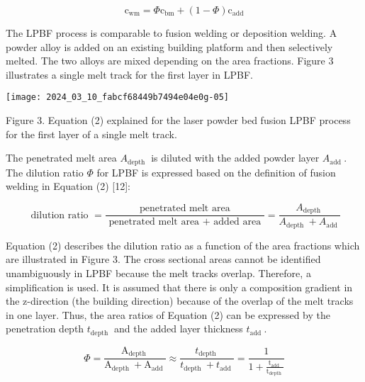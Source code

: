 \documentclass[10pt]{article}
\begin{document}
\begin{equation*}
\mathrm{c}_{\mathrm{wm}}=\Phi \mathrm{c}_{\mathrm{bm}}+(1-\Phi) \mathrm{c}_{\mathrm{add}} \tag{1}
\end{equation*}


The LPBF process is comparable to fusion welding or deposition welding. A powder alloy is added on an existing building platform and then selectively melted. The two alloys are mixed depending on the area fractions. Figure 3 illustrates a single melt track for the first layer in LPBF.

\begin{center}
\texttt{[image: 2024\_03\_10\_fabcf68449b7494e04e0g-05]}
\end{center}

Figure 3. Equation (2) explained for the laser powder bed fusion LPBF process for the first layer of a single melt track.

The penetrated melt area $A_{\text {depth }}$ is diluted with the added powder layer $A_{\text {add }}$. The dilution ratio $\Phi$ for LPBF is expressed based on the definition of fusion welding in Equation (2) [12]:


\begin{equation*}
\text { dilution ratio }=\frac{\text { penetrated melt area }}{\text { penetrated melt area }+ \text { added area }}=\frac{A_{\text {depth }}}{A_{\text {depth }}+A_{\text {add }}} \tag{2}
\end{equation*}


Equation (2) describes the dilution ratio as a function of the area fractions which are illustrated in Figure 3. The cross sectional areas cannot be identified unambiguously in LPBF because the melt tracks overlap. Therefore, a simplification is used. It is assumed that there is only a composition gradient in the z-direction (the building direction) because of the overlap of the melt tracks in one layer. Thus, the area ratios of Equation (2) can be expressed by the penetration depth $t_{\text {depth }}$ and the added layer thickness $t_{\text {add }}$.


\begin{equation*}
\Phi=\frac{\mathrm{A}_{\text {depth }}}{\mathrm{A}_{\text {depth }}+\mathrm{A}_{\text {add }}} \approx \frac{t_{\text {depth }}}{t_{\text {depth }}+t_{\text {add }}}=\frac{1}{1+\frac{\mathrm{t}_{\text {add }}}{\mathrm{t}_{\text {depth }}}} \tag{3}
\end{equation*}
\end{document}

